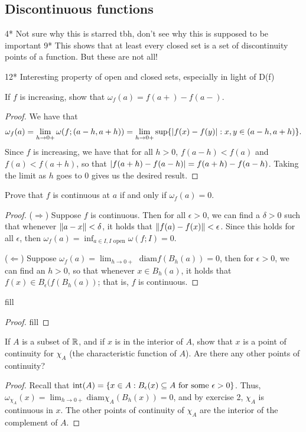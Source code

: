 \subsection{Discontinuous functions}

4* Not sure why this is starred tbh, don't see why this is supposed to be important
9* This shows that at least every closed set is a set of discontinuity points of a function. But these are not all!

12* Interesting property of open and closed sets, especially in light of D(f)

\begin{exercise}{1}
If $f$ is increasing, show that $\omega_f(a)=f(a+)-f(a-)$.
\end{exercise}
\begin{proof}
We have that 
\begin{align*}
    \omega_f(a) = \lim_{h\to0+}\omega(f;(a-h,a+h)) = \lim_{h \to 0+} \sup\{\left\lvert f(x)-f(y)\right\rvert: x,y\in (a-h,a+h)\}.
\end{align*}
Since $f$ is increasing, we have that for all $h>0$, $f(a-h)<f(a)$ and $f(a)<f(a+h)$, so that $\left\lvert f(a+h)-f(a-h)\right\rvert = f(a+h)-f(a-h)$.
Taking the limit as $h$ goes to 0 gives us the desired result.
\end{proof} 

\begin{exercise}{2}
Prove that $f$ is continuous at $a$ if and only if $\omega_f(a)=0$.
\end{exercise}
\begin{proof}
($\Rightarrow$)
Suppose $f$ is continuous.
Then for all $\epsilon>0$, we can find a $\delta>0$ such that whenever $\left\lVert a-x\right\rVert<\delta$, it holds that $\left\lVert f(a)-f(x)\right\rVert<\epsilon$. 
Since this holds for all $\epsilon$, then $\omega_f(a) = \inf_{a\in I, I\text{ open}}\omega(f; I) = 0$.

($\Leftarrow$)
Suppose $\omega_f(a)= \lim_{h\to 0+}\text{ diam}f(B_h(a)) = 0$, then for $\epsilon>0$, we can find an $h>0$, so that whenever $x\in B_h(a)$, it holds that $f(x) \in B_\epsilon(f(B_h(a))$;
that is, $f$ is continuous.
\end{proof} 

\begin{exercise}{4}
fill
\end{exercise}
\begin{proof}
fill
\end{proof} 

\begin{exercise}{5}
If $A$ is a subset of $\mathbb{R}$, and if $x$ is in the interior of $A$, show that $x$ is a point of continuity for $\chi_A$ (the characteristic function of $A$).
Are there any other points of continuity?
\end{exercise}
\begin{proof}
Recall that $\text{int}(A)=\{x\in A:B_\epsilon(x)\subseteq A\text{ for some }\epsilon>0\}$.
Thus, $\omega_{\chi_A}(x) = \lim_{h\to 0+}\text{diam}\chi_A(B_h(x)) = 0$, and by exercise 2, $\chi_A$ is continuous in $x$.
The other points of continuity of $\chi_A$ are the interior of the complement of $A$.
\end{proof} 

